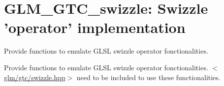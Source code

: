 \hypertarget{group__gtc__swizzle}{\section{\-G\-L\-M\-\_\-\-G\-T\-C\-\_\-swizzle\-: \-Swizzle 'operator' implementation}
\label{group__gtc__swizzle}
}


\-Provide functions to emulate \-G\-L\-S\-L swizzle operator fonctionalities.  


\-Provide functions to emulate \-G\-L\-S\-L swizzle operator fonctionalities. $<$\hyperlink{swizzle_8hpp}{glm/gtc/swizzle.\-hpp}$>$ need to be included to use these functionalities. 